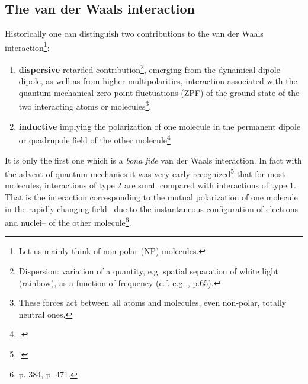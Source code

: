 \begin{subappendices}
\section{The van der Waals interaction}\label{C2AppD}
Historically one can distinguish two contributions to the van der Waals interaction\footnote{Let us mainly think of non polar (NP) molecules.}: 
\begin{enumerate}
\item \textbf{dispersive} retarded contribution\footnote{Dispersion: variation of a quantity, e.g. spatial separation of white light (rainbow), as a function of frequency (c.f. e.g. \cite{Israelachvili:85}, p.65).}, emerging from the dynamical dipole-dipole, as well as from higher multipolarities, interaction associated with the quantum mechanical zero point fluctuations (ZPF) of the ground state of the two interacting atoms or molecules\footnote{These forces act between all atoms and molecules, even non-polar, totally neutral ones.}.
\item \textbf{inductive} implying the polarization of one molecule in the permanent dipole or quadrupole field of the other molecule\footnote{\cite{Debye:20,Debye:21}.} 
\end{enumerate}

It is only the first one which is a \textit{bona fide} van der Waals interaction. In fact with the advent of quantum mechanics it was very early  recognized\footnote{\cite{London:30}.} that for most molecules, interactions of type 2 are small compared with interactions of type 1. That is the interaction corresponding to the mutual polarization of one molecule in the rapidly changing field --due to the instantaneous configuration of electrons and nuclei-- of the other molecule\footnote{\cite{Pauling:63} p. 384, \cite{Born:69} p. 471.}.




\end{subappendices}
